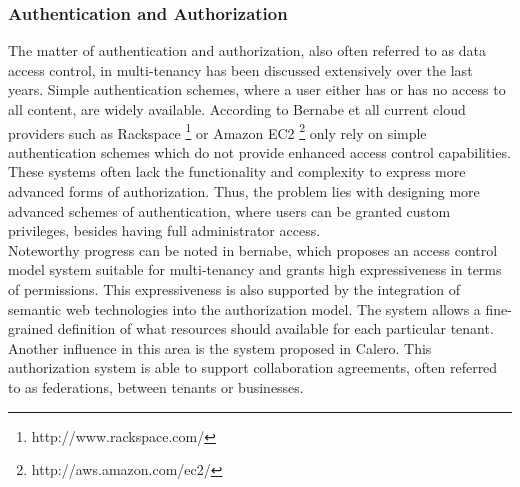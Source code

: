 \subsubsection{Authentication and Authorization}
The matter of authentication and authorization, also often referred to as data access control, in multi-tenancy has been discussed extensively over the last years. Simple authentication schemes, where a user either has or has no access to all content, are widely available. According to Bernabe et all \cite{Bernabe2012Auth} current cloud providers such as Rackspace \footnote{http://www.rackspace.com/} or Amazon EC2 \footnote{http://aws.amazon.com/ec2/} only rely on simple authentication schemes which do not provide enhanced access control capabilities. These systems often lack the functionality and complexity to express more advanced forms of authorization. Thus, the problem lies with designing more advanced schemes of authentication, where users can be granted custom privileges, besides having full administrator access.\\
Noteworthy progress can be noted in bernabe\cite{Bernabe2012Auth}, which proposes an access control model system suitable for multi-tenancy and grants high expressiveness in terms of permissions. This expressiveness is also supported by the integration of semantic web technologies into the authorization model. The system allows a fine-grained definition of what resources should available for each particular tenant. Another influence in this area is the system proposed in Calero\cite{Calero2010Auth}. This authorization system is able to support collaboration agreements, often referred to as federations, between tenants or businesses.

